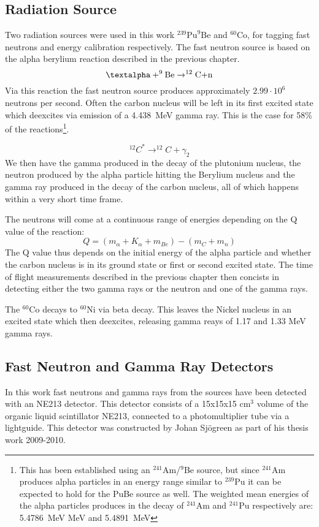 \documentclass[main.tex]{subfiles}
\begin{document}
\subsection{Radiation Source}
Two radiation sources were used in this work $^\text{239}\text{Pu}^\text{9}\text{Be}$ and $^\text{60}\text{Co}$, for tagging fast neutrons and energy calibration respectively. The fast neutron source is based on the alpha berylium reaction described in the previous chapter.
$$\text{\textalpha}+^\text{9}\text{Be}\rightarrow^\text{12}\text{C+n}$$
Via this reaction the fast neutron source produces approximately $\text{2.99}\cdot\text{10}^\text{6}$ neutrons per second\cite{Scherzinger:2017}. Often the carbon nucleus will be left in its first excited state which deexcites via emission of a \SI{4.438}{\mega\eV} gamma ray. This is the case for 58\% of the reactions\cite{Scherzinger:2015}\footnote{This has been established using an $^\text{241}$Am/$^\text{9}$Be source, but since $^\text{241}$Am produces alpha particles in an energy range similar to $^\text{239}$Pu it can be expected to hold for the PuBe source as well. The weighted mean energies of the alpha particles produces in the decay of $^\text{241}$Am and $^\text{241}$Pu respectively are: \SI{5.4786}{\mega\eV} MeV and \SI{5.4891}{\mega\eV}\cite{Scherzinger:2017}}.

$$^{12}C^ {*}\rightarrow^{12}C+\gamma_2$$
We then have the gamma produced in the decay of the plutonium nucleus, the neutron produced by the alpha particle hitting the Berylium nucleus and the gamma ray produced in the decay of the carbon nucleus, all of which happens within a very short time frame. 

The neutrons will come at a continuous range of energies depending on the Q value of the reaction:
$$Q = (m_\alpha + K_\alpha + m_{Be}) - (m_{C} + m_n)$$
The Q value thus depends on the initial energy of the alpha particle and whether the carbon nucleus is in its ground state or first or second excited state. The time of flight measurements described in the previous chapter then concists in detecting either the two gamma rays or the neutron and one of the gamma rays.

The $^\text{60}\text{Co}$ decays to $^\text{60}\text{Ni}$ via beta decay. This leaves the Nickel nucleus in an excited state which then deexcites, releasing gamma reays of 1.17 and 1.33 MeV gamma rays\cite{Nudat}.

\subsection{Fast Neutron and Gamma Ray Detectors}
In this work fast neutrons and gamma rays from the sources have been detected with an NE213 detector. This detector consists of a 15x15x15 \si{\cm}$^\text{3}$ volume of the organic liquid scintillator NE213, connected to a photomultiplier tube via a lightguide. This detector was constructed by Johan Sjögreen as part of his thesis work 2009-2010\cite{sjogren}.
\end{document}
